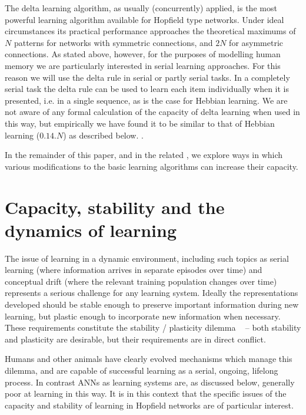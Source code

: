 The delta learning algorithm, as usually (concurrently) applied, is the most powerful learning algorithm available for Hopfield type networks.  
Under ideal circumstances its practical performance approaches the theoretical maximums of $N$ patterns for networks with symmetric connections, and $2N$ for asymmetric connections.   
As stated above, however, for the purposes of modelling human memory we are particularly interested in serial learning approaches.  
For this reason we will use the delta rule in serial or partly serial tasks.  In a completely serial task the delta rule can be used to learn each item individually when it is presented, i.e. in a single sequence, as is the case for Hebbian learning.  We are not aware of any formal calculation of the capacity of delta learning when used in this way, but empirically we have found it to be similar to that of Hebbian learning ($0.14.N$) as described below. .

In the remainder of this paper, and in the related \citep{McCallum2010b}, we explore ways in which various modifications to the basic learning algorithms can increase their capacity.


\newpage{}%
\section{Capacity, stability and the dynamics of learning}
\label{sec:StabilityDynamics}

The issue of learning in a dynamic environment, including such topics as serial learning (where information arrives in separate episodes over time) and conceptual drift (where the relevant training population changes over time) represents a serious challenge for any learning system. Ideally the representations developed should be stable enough to preserve important information during new learning, but plastic enough to incorporate new information when necessary. These requirements constitute the stability / plasticity dilemma ~\citep{Grossberg1987} -- both stability and plasticity are desirable, but their requirements are in direct conflict.

Humans and other animals have clearly evolved mechanisms which manage this dilemma, and are capable of successful learning as a serial, ongoing, lifelong process.   In contrast ANNs as learning systems are, as discussed below, generally poor at learning in this way.  It is in this context that the specific issues of the capacity and stability of learning in Hopfield networks are of particular interest.  

